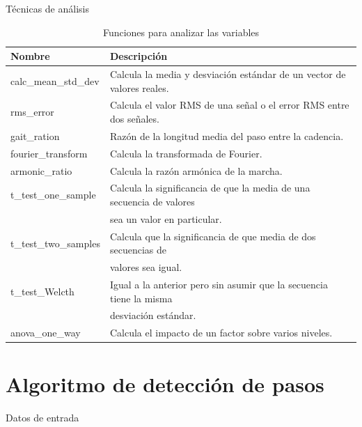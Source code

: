 \documentclass{beamer} %
\newcommand{\mono}[1]{{\ttfamily #1}}
\begin{document}
\begin{frame}{Técnicas de análisis}
\begin{table}
    \centering
    \caption{Funciones para analizar las variables}
    \label{tab:analytics}
    \scriptsize
    \begin{tabular}{ll}
        \toprule
        Nombre & Descripción \\
        \midrule
        \mono{calc\_mean\_std\_dev} & Calcula la media y desviación estándar de un vector de valores reales. \\
        \mono{rms\_error} & Calcula el valor RMS de una señal o el error RMS entre dos señales. \\
        \mono{gait\_ration} & Razón de la longitud media del paso entre la cadencia. \\
        \mono{fourier\_transform} & Calcula la transformada de Fourier. \\
        \mono{armonic\_ratio} & Calcula la razón armónica de la marcha. \\
        \mono{t\_test\_one\_sample} & Calcula la significancia de que la media de una secuencia de valores \\ &  sea un valor en particular. \\
        \mono{t\_test\_two\_samples} & Calcula que la significancia de que media de dos secuencias de \\ & valores sea igual. \\
        \mono{t\_test\_Welcth} & Igual a la anterior pero sin asumir que la secuencia tiene la misma \\ & desviación estándar. \\
        \mono{anova\_one\_way} & Calcula el impacto de un factor sobre varios niveles. \\
        \bottomrule
    \end{tabular}
\end{table}
\end{frame}

\section{Algoritmo de detección de pasos}

\begin{frame}{Datos de entrada}
    
\end{frame}
\end{document}
